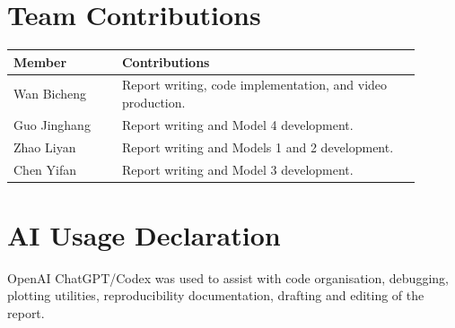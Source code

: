 \documentclass[11pt,a4paper]{article}
\begin{document}
\section{Team Contributions}
\begin{table}[htbp]\centering\small
\begin{tabular}{p{0.24\linewidth}p{0.66\linewidth}}\toprule
Member & Contributions\\\midrule
Wan Bicheng & Report writing, code implementation, and video production.\\
Guo Jinghang & Report writing and Model 4 development.\\
Zhao Liyan & Report writing and Models 1 and 2 development.\\
Chen Yifan & Report writing and Model 3 development.\\\bottomrule
\end{tabular}
\end{table}
\section*{AI Usage Declaration}
OpenAI ChatGPT/Codex was used to assist with code organisation, debugging,
plotting utilities, reproducibility documentation, drafting and editing of the report.
\end{document}
